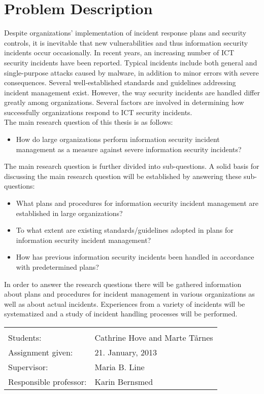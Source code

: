 \chapter*{Problem Description}
Despite organizations’ implementation of incident response plans and security controls, it is inevitable that new vulnerabilities and thus information security incidents occur occasionally. In recent years, an increasing number of ICT security incidents have been reported. Typical incidents include both general and single-purpose attacks caused by malware, in addition to minor errors with severe consequences. Several well-established standards and guidelines addressing incident management exist. However, the way security incidents are handled differ greatly among organizations. Several factors are involved in determining how successfully organizations respond to ICT security incidents. \\

The main research question of this thesis is as follows: 
\begin{itemize}
\item How do large organizations perform information security incident management as a measure against severe information security incidents?\\
\end{itemize}

The main research question is further divided into sub-questions. A solid basis for discussing the main research question will be established by answering these sub-questions:

\begin{itemize}
\item What plans and procedures for information security incident management are established in large organizations?
\item To what extent are existing standards/guidelines adopted in plans for information security incident management?
\item How has previous information security incidents been handled in accordance with predetermined plans? 
\end{itemize}

In order to answer the research questions there will be gathered information about plans and procedures for incident management in various organizations as well as about actual incidents. Experiences from a variety of incidents will be systematized and a study of incident handling processes will be performed.

\begin{tabular}{@{}p{4cm}l}
\vspace{0.4cm} & \vspace{0.4cm} \\
Students:		& Cathrine Hove and Marte T\aa rnes \\
Assignment given: & 21. January, 2013 \\
Supervisor:		& Maria B. Line \\
Responsible professor: 	& Karin Bernsmed \\
\end{tabular}